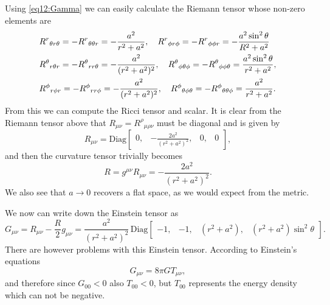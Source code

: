 \documentclass[11pt,a4paper, 
swedish, english %
]{article}
\begin{document}

Using \eqref{eq12:Gamma} we can easily calculate the Riemann tensor
whose non-zero elements are
\begin{equation}
\begin{aligned}
&{R^r}_{\theta r\theta}=-{R^r}_{\theta\theta r}
=-\frac{a^2}{r^2+a^2} \qc
{R^r}_{\phi r\phi}=-{R^r}_{\phi\phi r}
=-\frac{a^2\sin^2\theta}{R^2+a^2}\\
&{R^\theta}_{r\theta r}=-{R^\theta}_{rr\theta}
=-\frac{a^2}{(r^2+a^2)^2}\qc
{R^\theta}_{\phi\theta\phi}=-{R^\theta}_{\phi\phi\theta}
=\frac{a^2\sin^2\theta}{r^2+a^2},\\
&{R^\phi}_{r\phi r}=-{R^\phi}_{rr\phi}
=-\frac{a^2}{(r^2+a^2)^2}\qc
{R^\phi}_{\theta\phi\theta}=-{R^\phi}_{\theta\theta\phi}
=\frac{a^2}{r^2+a^2}.
\end{aligned}
\end{equation}
From this we can compute the Ricci tensor and scalar. It is clear from
the Riemann tensor above that $R_{\mu\nu}={R^\rho}_{\mu\rho\nu}$ must
be diagonal and is given by
\begin{equation}
R_{\mu\nu}=\text{Diag}
\begin{bmatrix}
0,& -\frac{2a^2}{(r^2+a^2)^2},& 0, &0
\end{bmatrix},
\end{equation}
and then the curvature tensor trivially becomes
\begin{equation}
R=g^{\mu\nu}R_{\mu\nu}=-\frac{2a^2}{(r^2+a^2)^2}.
\end{equation}
We also see that $a\to0$ recovers a flat space, as we would expect
from the metric.

We now can write down the Einstein tensor as
\begin{equation}
G_{\mu\nu}=R_{\mu\nu}-\frac{R}{2}g_{\mu\nu}
=\frac{a^2}{(r^2+a^2)^2}\,\text{Diag}\!
\begin{bmatrix}
-1,& -1,&
(r^2+a^2),&
(r^2+a^2)\sin^2\theta
\end{bmatrix}.
\end{equation}
There are however problems with this Einstein tensor. According to
Einstein's equations 
\begin{equation}
G_{\mu\nu}=8\pi G T_{\mu\nu},
\end{equation}
and therefore since $G_{00}<0$ also $T_{00}<0$, but $T_{00}$
represents the energy density which can not be negative. 






\end{document}
